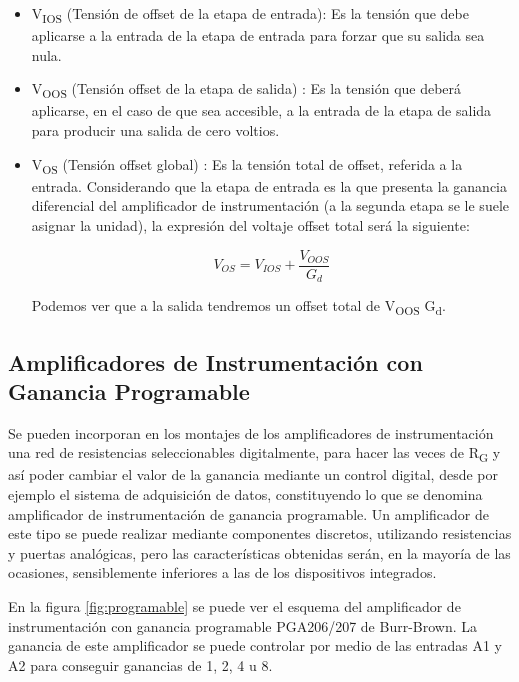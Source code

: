 \begin{itemize}
\item V\textsubscript{IOS} (Tensión de offset de la etapa de entrada): Es la tensión que debe aplicarse a la entrada de la etapa de entrada para forzar que su salida sea nula.
\item V\textsubscript{OOS} (Tensión offset de la etapa de salida) : Es la tensión que deberá aplicarse, en el caso de que sea accesible, a la entrada de la etapa de salida para producir una salida de cero voltios.
\item  V\textsubscript{OS} (Tensión offset global) : Es la tensión total de offset, referida a la entrada. Considerando que la etapa de entrada es la que presenta la ganancia diferencial del amplificador de instrumentación (a la segunda etapa se le suele asignar la unidad), la expresión del voltaje offset total será la siguiente:

\begin{equation}\label{eq5}
V_{OS} = V_{IOS} + \frac{V_{OOS}}{G_d}
\end{equation}

Podemos ver que a la salida tendremos un offset total de V\textsubscript{OOS} G\textsubscript{d}.
\end{itemize}



\subsection{Amplificadores de Instrumentación con Ganancia Programable} %
\label{ganancia_programable}

Se pueden incorporan en los montajes de los amplificadores de instrumentación una red de resistencias seleccionables digitalmente, para hacer las veces de R\textsubscript{G} y así poder cambiar el valor de la ganancia mediante un control digital, desde por ejemplo el sistema de adquisición de datos, constituyendo lo que se denomina amplificador de instrumentación de ganancia programable. Un amplificador de este tipo se puede realizar mediante componentes
discretos, utilizando resistencias y puertas analógicas, pero las características obtenidas serán, en la mayoría de las ocasiones, sensiblemente inferiores a las de los dispositivos integrados.

En la figura \ref{fig:programable}  se puede ver el esquema del amplificador de instrumentación con ganancia programable PGA206/207 de Burr-Brown. La ganancia de este amplificador se puede controlar por medio de las entradas A1 y A2 para conseguir ganancias de 1, 2, 4 u 8.

